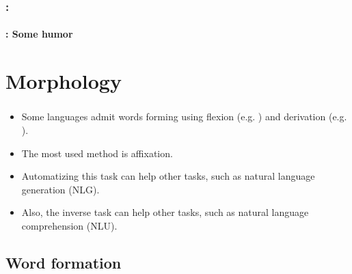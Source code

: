 \documentclass[xcolor=table]{beamer}
\begin{document}
\begin{frame}
	\frametitle{\insertshortsubtitle: \insertsection}
	\framesubtitle{\insertsubsection: Some humor}

	\begin{center}
	\end{center}

\end{frame}

\section{Morphology}

\begin{frame}
	\frametitle{\insertshortsubtitle}
	\framesubtitle{\insertsection}

	\begin{itemize}
		\item Some languages admit words forming using flexion (e.g. ) and derivation (e.g. ).
		\item The most used method is affixation.
		\item Automatizing this task can help other tasks, such as natural language generation (NLG).
		\item Also, the inverse task can help other tasks, such as natural language comprehension (NLU).
	\end{itemize}

\end{frame}

\subsection{Word formation}
\end{document}
